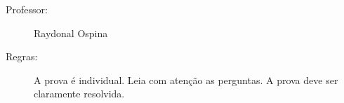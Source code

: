 \documentclass[a4paper,11pt,oneside,twocolumn]{Config/milktest}
\begin{document}
\beb
{\small
\begin{description}
\item[Professor:] Raydonal Ospina

\item[Regras:] A prova é individual. Leia com atenção as perguntas. A prova deve ser claramente resolvida. 

\end{description}
}
\eeb

\balance
\end{document}
